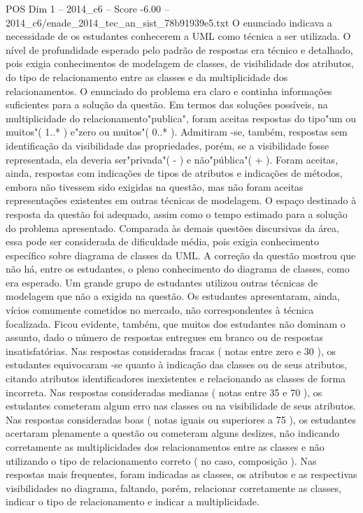 \begin{textsample}{POS Dim 1 – 2014\_c6 – Score -6.00 – 2014\_c6/enade\_2014\_tec\_an\_sist\_78b91939e5.txt}
O enunciado indicava a necessidade de os estudantes conhecerem a UML como técnica a ser utilizada.
O nível de profundidade esperado pelo padrão de respostas era técnico e detalhado, pois exigia conhecimentos de modelagem de classes, de visibilidade dos atributos, do tipo de relacionamento entre as classes e da multiplicidade dos relacionamentos.
O enunciado do problema era claro e continha informações suficientes para a solução da questão.
Em termos das soluções possíveis, na multiplicidade do relacionamento"publica", foram aceitas respostas do tipo"um ou muitos"( 1..* ) e"zero ou muitos"( 0..* ).
Admitiram -se, também, respostas sem identificação da visibilidade das propriedades, porém, se a visibilidade fosse representada, ela deveria ser"privada"( - ) e não"pública"( + ).
Foram aceitas, ainda, respostas com indicações de tipos de atributos e indicações de métodos, embora não tivessem sido exigidas na questão, mas não foram aceitas representações existentes em outras técnicas de modelagem.
O espaço destinado à resposta da questão foi adequado, assim como o tempo estimado para a solução do problema apresentado.
Comparada às demais questões discursivas da área, essa pode ser considerada de dificuldade média, pois exigia conhecimento específico sobre diagrama de classes da UML.
A correção da questão mostrou que não há, entre os estudantes, o pleno conhecimento do diagrama de classes, como era esperado.
Um grande grupo de estudantes utilizou outras técnicas de modelagem que não a exigida na questão.
Os estudantes apresentaram, ainda, vícios comumente cometidos no mercado, não correspondentes à técnica focalizada.
Ficou evidente, também, que muitos dos estudantes não dominam o assunto, dado o número de respostas entregues em branco ou de respostas insatisfatórias.
Nas respostas consideradas fracas ( notas entre zero e 30 ), os estudantes equivocaram -se quanto à indicação das classes ou de seus atributos, citando atributos identificadores inexistentes e relacionando as classes de forma incorreta.
Nas respostas consideradas medianas ( notas entre 35 e 70 ), os estudantes cometeram algum erro nas classes ou na visibilidade de seus atributos.
Nas respostas consideradas boas ( notas iguais ou superiores a 75 ), os estudantes acertaram plenamente a questão ou cometeram alguns deslizes, não indicando corretamente as multiplicidades dos relacionamentos entre as classes e não utilizando o tipo de relacionamento correto ( no caso, composição ).
Nas respostas mais frequentes, foram indicadas as classes, os atributos e as respectivas visibilidades no diagrama, faltando, porém, relacionar corretamente as classes, indicar o tipo de relacionamento e indicar a multiplicidade.

\end{textsample}
